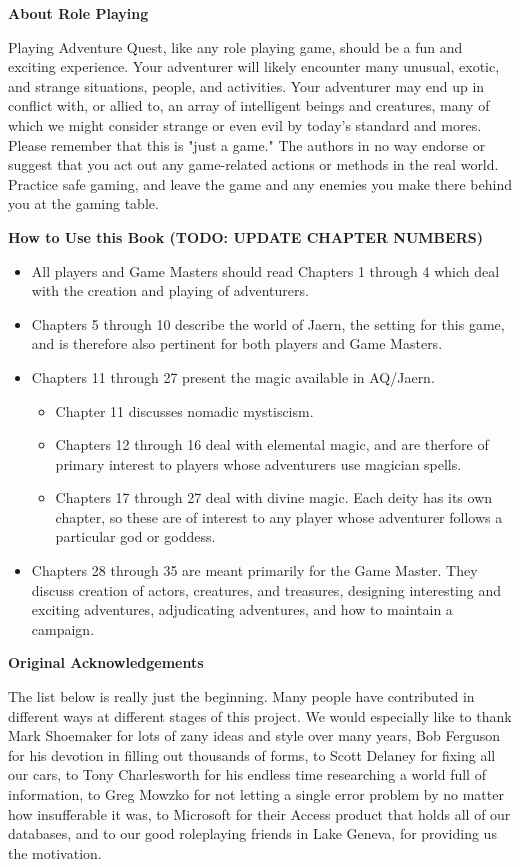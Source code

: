 \textbf{About Role Playing}

Playing Adventure Quest, like any role playing game, should be a fun and exciting experience. Your adventurer will likely encounter many unusual, exotic, and strange situations, people, and activities. Your adventurer may end up in conflict with, or allied to, an array of intelligent beings and creatures, many of which we might consider strange or even evil by today’s standard and mores. Please remember that this is "just a game." The authors in no way endorse or suggest that you act out any game-related actions or methods in the real world. Practice safe gaming, and leave the game and any enemies you make there behind you at the gaming table.

\textbf{How to Use this Book (TODO: UPDATE CHAPTER NUMBERS)}
\begin{itemize}
\item All players and Game Masters should read Chapters 1 through 4 which deal with the creation and playing of adventurers.
\item Chapters 5 through 10 describe the world of Jaern, the setting for this game, and is therefore also pertinent for both players and Game Masters.
\item Chapters 11 through 27 present the magic available in AQ/Jaern. 
\begin{itemize}
\item Chapter 11 discusses nomadic mystiscism. 
\item Chapters 12 through 16 deal with elemental magic, and are therfore of primary interest to players whose adventurers use magician spells.
\item Chapters 17 through 27 deal with divine magic. Each deity has its own chapter, so these are of interest to any player whose adventurer follows a particular god or goddess.
\end{itemize}
\item Chapters 28 through 35 are meant primarily for the Game Master. They discuss creation of actors, creatures, and treasures, designing interesting and exciting adventures, adjudicating adventures, and how to maintain a campaign.
\end{itemize}

\textbf{Original Acknowledgements}

The list below is really just the beginning. Many people have contributed in different ways at different stages of this project. We would especially like to thank Mark Shoemaker for lots of zany ideas and style over many years, Bob Ferguson for his devotion in filling out thousands of forms, to Scott Delaney for fixing all our cars, to Tony Charlesworth for his endless time researching a world full of information, to Greg Mowzko for not letting a single error problem by no matter how insufferable it was, to Microsoft for their Access product that holds all of our databases, and to our good roleplaying friends in Lake Geneva, for providing us the motivation.


